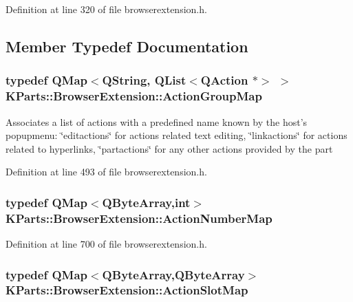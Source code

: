 \-Definition at line 320 of file browserextension.\-h.



\subsection{\-Member \-Typedef \-Documentation}
\hypertarget{classKParts_1_1BrowserExtension_a73ab162c395443c0227946524a8ee04c}{
\subsubsection[{\-Action\-Group\-Map}]{\setlength{\rightskip}{0pt plus 5cm}typedef \-Q\-Map$<$\-Q\-String, \-Q\-List$<$\-Q\-Action $\ast$$>$ $>$ {\bf \-K\-Parts\-::\-Browser\-Extension\-::\-Action\-Group\-Map}}}\label{classKParts_1_1BrowserExtension_a73ab162c395443c0227946524a8ee04c}
\-Associates a list of actions with a predefined name known by the host's popupmenu\-: \char`\"{}editactions\char`\"{} for actions related text editing, \char`\"{}linkactions\char`\"{} for actions related to hyperlinks, \char`\"{}partactions\char`\"{} for any other actions provided by the part 

\-Definition at line 493 of file browserextension.\-h.

\hypertarget{classKParts_1_1BrowserExtension_a71369db13dead055035067d4f8ff498d}{
\subsubsection[{\-Action\-Number\-Map}]{\setlength{\rightskip}{0pt plus 5cm}typedef \-Q\-Map$<$\-Q\-Byte\-Array,int$>$ {\bf \-K\-Parts\-::\-Browser\-Extension\-::\-Action\-Number\-Map}}}\label{classKParts_1_1BrowserExtension_a71369db13dead055035067d4f8ff498d}


\-Definition at line 700 of file browserextension.\-h.

\hypertarget{classKParts_1_1BrowserExtension_ac931bbd8189a4386b609180b5e704344}{
\subsubsection[{\-Action\-Slot\-Map}]{\setlength{\rightskip}{0pt plus 5cm}typedef \-Q\-Map$<$\-Q\-Byte\-Array,\-Q\-Byte\-Array$>$ {\bf \-K\-Parts\-::\-Browser\-Extension\-::\-Action\-Slot\-Map}}}\label{classKParts_1_1BrowserExtension_ac931bbd8189a4386b609180b5e704344}


